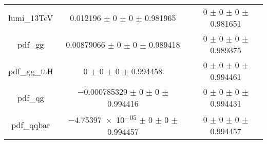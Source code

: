 \begin{table}
\begin{tabular}{ccc}
lumi\_13TeV & \num{0.012196} $\pm$ \num{0} $\pm$ \num{0} $\pm$ \num{0.981965} & \num{0} $\pm$ \num{0} $\pm$ \num{0} $\pm$ \num{0.981651}\\
pdf\_gg & \num{0.00879066} $\pm$ \num{0} $\pm$ \num{0} $\pm$ \num{0.989418} & \num{0} $\pm$ \num{0} $\pm$ \num{0} $\pm$ \num{0.989375}\\
pdf\_gg\_ttH & \num{0} $\pm$ \num{0} $\pm$ \num{0} $\pm$ \num{0.994458} & \num{0} $\pm$ \num{0} $\pm$ \num{0} $\pm$ \num{0.994461}\\
pdf\_qg & \num{-0.000785329} $\pm$ \num{0} $\pm$ \num{0} $\pm$ \num{0.994416} & \num{0} $\pm$ \num{0} $\pm$ \num{0} $\pm$ \num{0.994431}\\
pdf\_qqbar & \num{-4.75397e-05} $\pm$ \num{0} $\pm$ \num{0} $\pm$ \num{0.994457} & \num{0} $\pm$ \num{0} $\pm$ \num{0} $\pm$ \num{0.994457}\\
\bottomrule
\end{tabular}
\end{table}